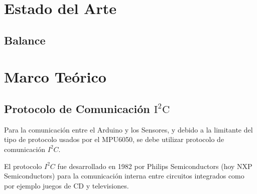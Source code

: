 \documentclass[12pt,a4paper]{article}
\let\stdsection\section
\renewcommand\section{\newpage\stdsection}
\begin{document}
\section{Estado del Arte}
\subsection{Balance}



\section{Marco Te\'orico}

\subsection{Protocolo de Comunicación $\mathbf{\mathrm{I^2C}}$}
Para la comunicación entre el Arduino y los Sensores, y debido a la limitante del tipo de protocolo usados por el MPU6050, se debe utilizar protocolo de comunicación $I^2C$.

El protocolo $I^2C$ fue desarrollado en 1982 por Philips Semiconductors (hoy NXP Semiconductors) para la comunicación interna entre circuitos integrados como por ejemplo juegos de CD y televisiones.
\end{document}
